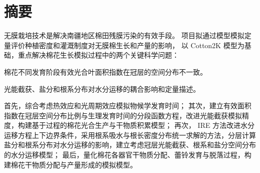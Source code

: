 \chapter*{摘要}
无膜栽培技术是解决南疆地区棉田残膜污染的有效手段。
项目拟通过模型模拟定量评价种植密度和灌溉制度对无膜棉生长和产量的影响，
以 Cotton2K 模型为基础，重点解决棉花生长模拟过程中的两个关键科学问题：
\begin{enumerate*}
    \item 棉花不同发育阶段有效光合叶面积指数在冠层的空间分布不一致。
    \item 光能截获、盐分和根系分布对水分运移的耦合影响和定量描述。
\end{enumerate*}
首先，综合考虑热效应和光周期效应模拟物候学发育时间；
其次，建立有效面积指数在冠层空间分布比例与生理发育时间的分段函数方程，改进光能截获模拟精度，构建基于过程的棉花光合生产与干物质积累模型；
再次， IRE 方法改进水分运移方程上下边界条件，采用根系吸水与根长密度分布统一求解的方法，分层计算盐分和根系分布对水分运移的影响，建立考虑冠层光能截获、根系和盐分空间分布的水分运移模型；
最后，量化棉花各器官干物质分配、蕾铃发育与脱落过程，构建棉花干物质分配与产量形成的模拟模型。